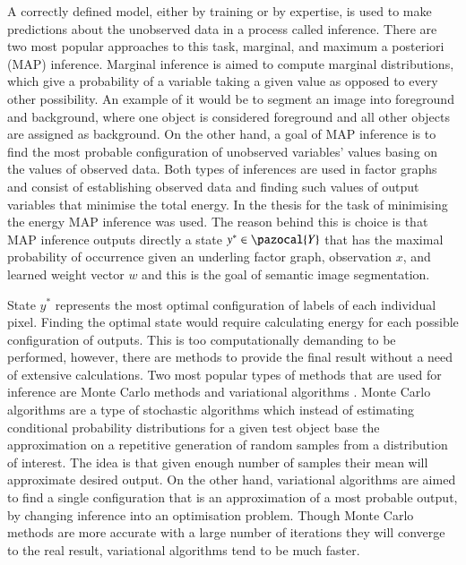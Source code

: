 A correctly defined model, either by training or by expertise, is used to make predictions about the unobserved data in a process called inference. There are two most popular approaches to this task, marginal, and maximum a posteriori (MAP) inference. Marginal inference is aimed to compute marginal distributions, which give a probability of a variable taking a given value as opposed to every other possibility. An example of it would be to segment an image into foreground and background, where one object is considered foreground and all other objects are assigned as background. On the other hand, a goal of MAP inference is to find the most probable configuration of unobserved variables’ values basing on the values of observed data. Both types of inferences are used in factor graphs and consist of establishing observed data and finding such values of output variables that minimise the total energy. In the thesis for the task of minimising the energy MAP inference was used. The reason behind this is choice is that MAP inference outputs directly a state $y^* \in \pazocal{Y}$ that has the maximal probability of occurrence given an underling factor graph, observation $x$, and learned weight vector $w$ and this is the goal of semantic image segmentation. 

State $y^*$ represents the most optimal configuration of labels of each individual pixel. Finding the optimal state would require calculating energy for each possible configuration of outputs. This is too computationally demanding to be performed, however, there are methods to provide the final result without a need of extensive calculations. Two most popular types of methods that are used for inference are Monte Carlo methods and variational algorithms \cite{crf_sutton}. Monte Carlo algorithms are a type of stochastic algorithms which instead of estimating conditional probability distributions for a given test object base the approximation on a repetitive generation of random samples from a distribution of interest. The idea is that given enough number of samples their mean will approximate desired output. On the other hand, variational algorithms are aimed to find a single configuration that is an approximation of a most probable output, by changing inference into an optimisation problem. Though Monte Carlo methods are more accurate with a large number of iterations they will converge to the real result, variational algorithms tend to be much faster. 

